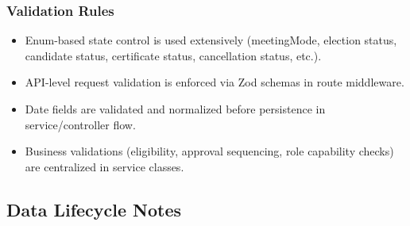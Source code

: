 \documentclass[12pt,a4paper]{article}
\begin{document}
\subsubsection{Validation Rules}
\begin{itemize}[noitemsep]
  \item Enum-based state control is used extensively (meetingMode, election status, candidate status, certificate status, cancellation status, etc.).
  \item API-level request validation is enforced via Zod schemas in route middleware.
  \item Date fields are validated and normalized before persistence in service/controller flow.
  \item Business validations (eligibility, approval sequencing, role capability checks) are centralized in service classes.
\end{itemize}

\subsection{Data Lifecycle Notes}
\end{document}
